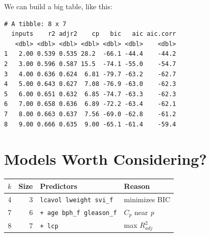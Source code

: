 \documentclass[]{book}
\newenvironment{Shaded}{\begin{snugshade}}{\end{snugshade}}
\newcommand{\KeywordTok}[1]{\textcolor[rgb]{0.13,0.29,0.53}{\textbf{#1}}}
\newcommand{\DataTypeTok}[1]{\textcolor[rgb]{0.13,0.29,0.53}{#1}}
\newcommand{\DecValTok}[1]{\textcolor[rgb]{0.00,0.00,0.81}{#1}}
\newcommand{\StringTok}[1]{\textcolor[rgb]{0.31,0.60,0.02}{#1}}
\newcommand{\OperatorTok}[1]{\textcolor[rgb]{0.81,0.36,0.00}{\textbf{#1}}}
\newcommand{\NormalTok}[1]{#1}
\theoremstyle{definition}
\theoremstyle{definition}
\theoremstyle{definition}
\theoremstyle{remark}
\begin{document}
We can build a big table, like this:

\begin{Shaded}
\end{Shaded}

\begin{verbatim}
# A tibble: 8 x 7
  inputs    r2 adjr2    cp   bic   aic aic.corr
   <dbl> <dbl> <dbl> <dbl> <dbl> <dbl>    <dbl>
1   2.00 0.539 0.535 28.2  -66.1 -44.4    -44.2
2   3.00 0.596 0.587 15.5  -74.1 -55.0    -54.7
3   4.00 0.636 0.624  6.81 -79.7 -63.2    -62.7
4   5.00 0.643 0.627  7.08 -76.9 -63.0    -62.3
5   6.00 0.651 0.632  6.85 -74.7 -63.3    -62.3
6   7.00 0.658 0.636  6.89 -72.2 -63.4    -62.1
7   8.00 0.663 0.637  7.56 -69.0 -62.8    -61.2
8   9.00 0.666 0.635  9.00 -65.1 -61.4    -59.4
\end{verbatim}

\section{Models Worth Considering?}\label{models-worth-considering}

\begin{longtable}[]{@{}rrll@{}}
\toprule
\(k\) & Size & Predictors & Reason\tabularnewline
\midrule
\endhead
4 & 3 & \texttt{lcavol\ lweight\ svi\_f} & minimizes BIC\tabularnewline
7 & 6 & \texttt{+\ age\ bph\_f\ gleason\_f} & \(C_p\) near
\emph{p}\tabularnewline
8 & 7 & \texttt{+\ lcp} & max \(R^2_{adj}\)\tabularnewline
\bottomrule
\end{longtable}
\end{document}
